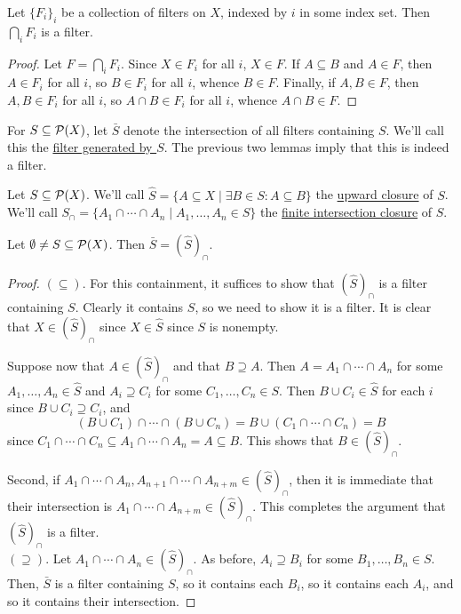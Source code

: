 \documentclass[12pt]{exam}
\begin{document}
\begin{lem} Let $\{ F_i \}_i$ be a collection of filters on $X$, indexed by $i$ in some index set. Then $\bigcap_i F_i$ is a filter. \end{lem}
\begin{proof}
	Let $F = \bigcap_i F_i$. Since $X \in F_i$ for all $i$, $X \in F$. If $A \subseteq B$ and $A \in F$, then $A \in F_i$ for all $i$, so $B \in F_i$ for all $i$, whence $B \in F$. Finally, if $A,B \in F$, then $A,B \in F_i$ for all $i$, so $A \cap B \in F_i$ for all $i$, whence $A \cap B \in F$.
\end{proof}

\begin{definition} For $S \subseteq \mathcal{P}(X)$, let $\bar{S}$ denote the intersection of all filters containing $S$. We'll call this the \underline{filter generated by $S$}. The previous two lemmas imply that this is indeed a filter. \end{definition}

\begin{definition} Let $S \subseteq \mathcal{P}(X)$. We'll call $\hat{S} = \{ A \subseteq X \mid \exists B \in S : A \subseteq B \}$ the \underline{upward closure} of $S$. We'll call $S_{\cap} = \{ A_1 \cap \cdots \cap A_n \mid A_1,\ldots,A_n \in S \}$ the \underline{finite intersection closure} of $S$. \end{definition}

\begin{lem} Let $\emptyset \neq S \subseteq \mathcal{P}(X)$. Then $\bar{S} = (\hat{S})_{\cap}$. \end{lem}
\begin{proof}
	$(\subseteq)$. For this containment, it suffices to show that $(\hat{S})_{\cap}$ is a filter containing $S$. Clearly it contains $S$, so we need to show it is a filter. It is clear that $X \in (\hat{S})_{\cap}$ since $X \in \hat{S}$ since $S$ is nonempty.
	
	Suppose now that $A \in (\hat{S})_{\cap}$ and that $B \supseteq A$. Then $A = A_1 \cap \cdots \cap A_n$ for some $A_1,\ldots,A_n \in \hat{S}$ and $A_i \supseteq C_i$ for some $C_1,\ldots,C_n \in S$. Then $B \cup C_i \in \hat{S}$ for each $i$ since $B \cup C_i \supseteq C_i$, and
	\[ (B \cup C_1) \cap \cdots \cap (B \cup C_n) = B \cup (C_1 \cap \cdots \cap C_n) = B \]
	since $C_1 \cap \cdots \cap C_n \subseteq A_1 \cap \cdots \cap A_n = A \subseteq B$. This shows that $B \in (\hat{S})_{\cap}$.
	
	Second, if $A_1 \cap \cdots \cap A_n,A_{n+1} \cap \cdots \cap A_{n+m} \in (\hat{S})_{\cap}$, then it is immediate that their intersection is $A_1 \cap \cdots \cap A_{n+m} \in (\hat{S})_{\cap}$. This completes the argument that $(\hat{S})_{\cap}$ is a filter. \\
	
	$(\supseteq)$. Let $A_1 \cap \cdots \cap A_n \in (\hat{S})_{\cap}$. As before, $A_i \supseteq B_i$ for some $B_1,\ldots,B_n \in S$. Then, $\bar{S}$ is a filter containing $S$, so it contains each $B_i$, so it contains each $A_i$, and so it contains their intersection.
\end{proof}
\end{document}
